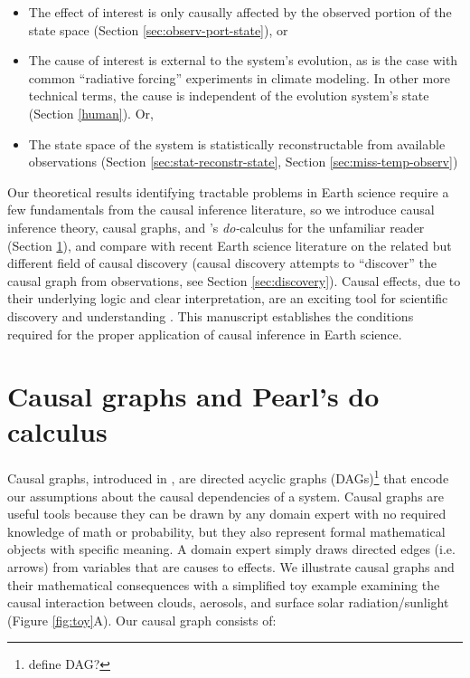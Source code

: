 \documentclass[12pt]{article}
\begin{document}
\begin{itemize}
\item The effect of interest is only causally affected by the observed
  portion of the state space (Section \ref{sec:observ-port-state}), or
\item The cause of interest is external to the system's evolution, as
  is the case with common ``radiative forcing'' experiments in climate
  modeling. In other more technical terms, the cause is independent of
  the evolution system's state (Section \ref{human}). Or,
\item The state space of the system is statistically reconstructable
  from available observations (Section \ref{sec:stat-reconstr-state},
  Section \ref{sec:miss-temp-observ})

\end{itemize}

Our theoretical results identifying tractable problems in Earth
science require a few fundamentals from the causal inference
literature, so we introduce causal inference theory, causal graphs,
and \citet{pearl2009}'s \textit{do-}calculus for the unfamiliar reader
(Section \ref{sec:causal-graphs-pearls}), and compare with recent
Earth science literature on the related but different field of causal
discovery (causal discovery attempts to ``discover'' the causal graph
from observations, see Section \ref{sec:discovery}). Causal effects,
due to their underlying logic and clear interpretation, are an
exciting tool for scientific discovery and understanding
\citep{hannart-da,naveau-2020}. This manuscript establishes the
conditions required for the proper application of causal inference in
Earth science.


\section{Causal graphs and Pearl's do calculus}
\label{sec:causal-graphs-pearls}

Causal graphs, introduced in \citet{pearl1995causal}, are directed
acyclic graphs (DAGs)\footnote{define DAG?} that encode our
assumptions about the causal dependencies of a system. Causal graphs
are useful tools because they can be drawn by any domain expert with
no required knowledge of math or probability, but they also represent
formal mathematical objects with specific meaning. A domain expert
simply draws directed edges (i.e. arrows) from variables that are
causes to effects. We illustrate causal graphs and their mathematical
consequences with a simplified toy example examining the causal
interaction between clouds, aerosols, and surface solar
radiation/sunlight (Figure \ref{fig:toy}A). Our causal graph consists
of:
\end{document}

